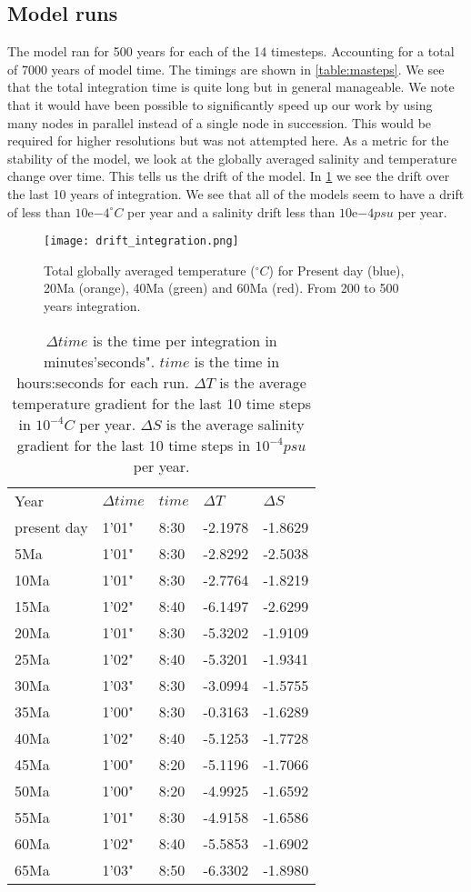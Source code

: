 \subsection{Model runs}
The model ran for 500 years for each of the 14 timesteps. Accounting for a total of 7000 years of model time. The timings are shown in \cref{table:masteps}. We see that the total integration time is quite long but in general manageable. We note that it would have been possible to significantly speed up our work by using many nodes in parallel instead of a single node in succession. This would be required for higher resolutions but was not attempted here.
As a metric for the stability of the model, we look at the globally averaged salinity and temperature change over time. This tells us the drift of the model. In \cref{table:mastepstable} we see the drift over the last 10 years of integration. We see that all of the models seem to have a drift of less than $10\mathrm{e}{-4}^{\circ}C$ per year and a salinity drift less than $10\mathrm{e}{-4} psu$ per year.
\begin{figure}[H]
	\texttt{[image: drift\_integration.png]}
	\caption{Total globally averaged temperature ($^{\circ}C$) for Present day (blue), 20Ma (orange), 40Ma (green) and 60Ma (red). From 200 to 500 years integration.}
	\label{fig:avtempgrph}
\end{figure}
\begin{table}[H]
	\centering
	\begin{tabular}{lllll}
Year & $\Delta time$ & $time$ & $\Delta T$& $\Delta S$\\
present day & 1'01" & 8:30& -2.1978& -1.8629\\
5Ma& 1'01" & 8:30& -2.8292& -2.5038 \\
10Ma & 1'01" & 8:30& -2.7764& -1.8219\\
15Ma & 1'02" & 8:40& -6.1497& -2.6299\\
20Ma & 1'01" & 8:30&  -5.3202& -1.9109\\
25Ma & 1'02" & 8:40& -5.3201& -1.9341\\
30Ma & 1'03" & 8:30& -3.0994& -1.5755\\
35Ma & 1'00" & 8:30& -0.3163&-1.6289\\
40Ma & 1'02" & 8:40& -5.1253& -1.7728\\
45Ma & 1'00" & 8:20& -5.1196& -1.7066\\
50Ma & 1'00" & 8:20& -4.9925& -1.6592\\
55Ma & 1'01" & 8:30& -4.9158& -1.6586\\
60Ma & 1'02" & 8:40& -5.5853& -1.6902\\
65Ma & 1'03" & 8:50& -6.3302& -1.8980\\
	\end{tabular}

\caption{$\Delta time$ is the time per integration in minutes'seconds". $time$ is the time in hours:seconds for each run. $\Delta T$ is the average temperature gradient for the last 10 time steps in $10^{-4} C$ per year. $\Delta S$ is the average salinity gradient for the last 10 time steps in $10^{-4} psu$ per year.}
\label{table:mastepstable}
\end{table}


